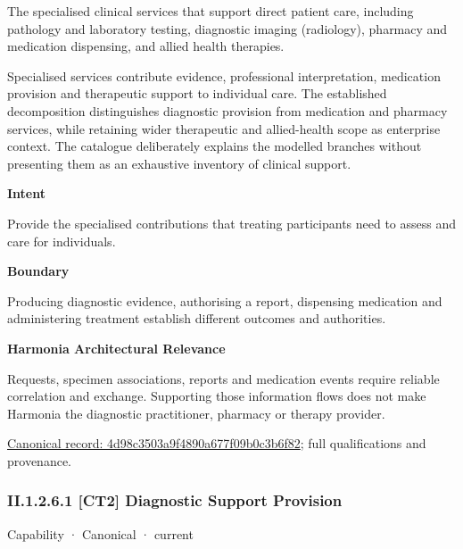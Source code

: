 The specialised clinical services that support direct patient care, including pathology and laboratory testing, diagnostic imaging (radiology), pharmacy and medication dispensing, and allied health therapies.



Specialised services contribute evidence, professional interpretation, medication provision and therapeutic support to individual care. The established decomposition distinguishes diagnostic provision from medication and pharmacy services, while retaining wider therapeutic and allied-health scope as enterprise context. The catalogue deliberately explains the modelled branches without presenting them as an exhaustive inventory of clinical support.



\textbf{Intent}



Provide the specialised contributions that treating participants need to assess and care for individuals.



\textbf{Boundary}



Producing diagnostic evidence, authorising a report, dispensing medication and administering treatment establish different outcomes and authorities.



\textbf{Harmonia Architectural Relevance}



Requests, specimen associations, reports and medication events require reliable correlation and exchange. Supporting those information flows does not make Harmonia the diagnostic practitioner, pharmacy or therapy provider.


{\footnotesize \href{../../../../../../../continuum/strategy/capability/4d98c3503a9f4890a677f09b0c3b6f82.md}{Canonical record: 4d98c3503a9f4890a677f09b0c3b6f82}; full qualifications and provenance.}\par
\subsubsection*{II.1.2.6.1 [CT2] Diagnostic Support Provision}
\label{navigation:II.1.2.6.1}

\label{element:827910cf74ae4061afbda52dde3da106}
{\small Capability · Canonical · current}\par

